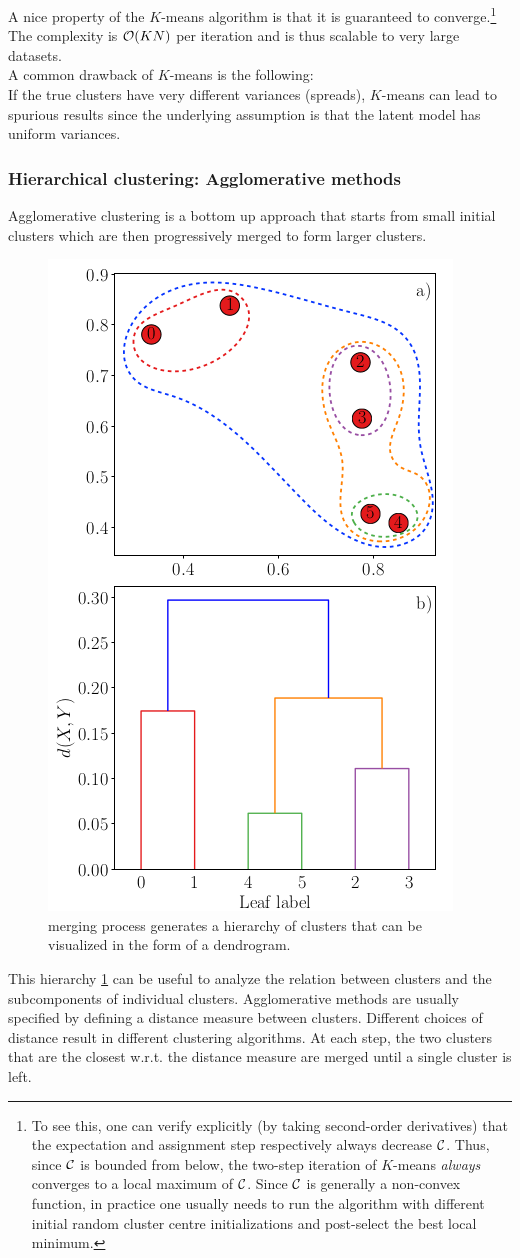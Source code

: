 A nice property of the $K$-means algorithm is that it is guaranteed to converge.\footnote{To see this, one can verify explicitly (by taking second-order derivatives) that the expectation and assignment step respectively always decrease $\mathcal{C}$. Thus, since $\mathcal{C}$ is bounded from below, the two-step iteration of $K$-means \emph{always} converges to a local maximum of $\mathcal{C}$. Since $\mathcal{C}$ is generally a non-convex function, in practice one usually needs to run the algorithm with different initial random cluster centre initializations and post-select the best local minimum.} The complexity is $\mathcal{O}(KN)$ per iteration and is thus scalable to very large datasets.\\
A common drawback of $K$-means is the following:\\
If the true clusters have very different variances (spreads), $K$-means can lead to spurious results since the underlying assumption is that the latent model has uniform variances.

\subsubsection{Hierarchical clustering: Agglomerative methods}
\label{subsubsec:ClusterPracticalHierarchical}
Agglomerative clustering is a bottom up approach that starts from small initial clusters which are then progressively merged to form larger clusters.
\begin{figure}[h!]
	\centering
	\includegraphics[width=0.4\linewidth]{gfx/HierarchicalCLustering}
	\caption{\itshapeThe merging process generates a hierarchy of clusters that can be visualized in the form of a dendrogram.}
	\label{fig:hierarchicalclustering}
\end{figure}
This hierarchy \ref{fig:hierarchicalclustering} can be useful to analyze the relation between clusters and the subcomponents of individual clusters. Agglomerative methods are usually specified by defining a distance measure between clusters. Different choices of distance result in different clustering algorithms. At each step, the two clusters that are the closest w.r.t. the distance measure are merged until a single cluster is left.

